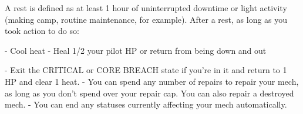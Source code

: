 A rest is defined as at least 1 hour of uninterrupted downtime or light activity (making camp,  
routine maintenance, for example). After a rest, as long as you took action to do so:
 
             -   Cool heat  
             -    Heal 1/2 your pilot HP or return from being down and out
 
             -    Exit the CRITICAL or CORE BREACH state if you’re in it and return to 1 HP and  
                 clear 1 heat.  
             -   You can spend any number of repairs to repair your mech, as long as you don’t  
                 spend over your repair cap. You can also repair a destroyed mech.  
             -   You can end any statuses currently affecting your mech automatically.  

                                                                                                                 
